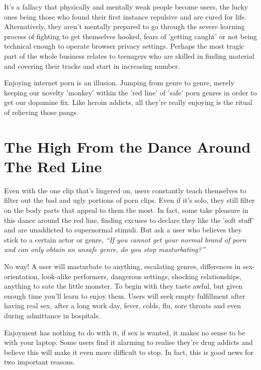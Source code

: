 \documentclass[
]{book}
\begin{document}
It's a fallacy that physically and mentally weak people become users, the lucky ones being those who found their first instance repulsive and are cured for life. Alternatively, they aren't mentally prepared to go through the severe learning process of fighting to get themselves hooked, fears of 'getting caught' or not being technical enough to operate browser privacy settings. Perhaps the most tragic part of the whole business relates to teenagers who are skilled in finding material and covering their tracks and start in increasing number.

Enjoying internet porn is an illusion. Jumping from genre to genre, merely keeping our novelty 'monkey' within the 'red line' of 'safe' porn genres in order to get our dopamine fix. Like heroin addicts, all they're really enjoying is the ritual of relieving those pangs.

\hypertarget{the-high-from-the-dance-around-the-red-line}{%
\section{The High From the Dance Around The Red Line}\label{the-high-from-the-dance-around-the-red-line}}

Even with the one clip that's lingered on, users constantly teach themselves to filter out the bad and ugly portions of porn clips. Even if it's solo, they still filter on the body parts that appeal to them the most. In fact, some take pleasure in this dance around the red line, finding excuses to declare they like the 'soft stuff' and are unaddicted to supernormal stimuli. But ask a user who believes they stick to a certain actor or genre, \emph{``If you cannot get your normal brand of porn and can only obtain an unsafe genre, do you stop masturbating?''}

No way! A user will masturbate to anything, escalating genres, differences in sex-orientation, look-alike performers, dangerous settings, shocking relationships, anything to sate the little monster. To begin with they taste awful, but given enough time you'll learn to enjoy them. Users will seek empty fulfillment after having real sex, after a long work day, fever, colds, flu, sore throats and even during admittance in hospitals.

Enjoyment has nothing to do with it, if sex is wanted, it makes no sense to be with your laptop. Some users find it alarming to realise they're drug addicts and believe this will make it even more difficult to stop. In fact, this is good news for two important reasons.
\end{document}
